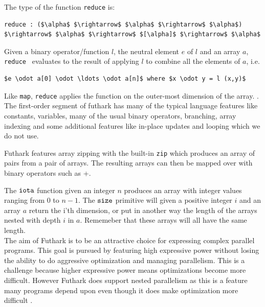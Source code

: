\documentclass[11pt]{article}
\begin{document}
The type of the function {\tt reduce} is: 
\begin{lstlisting}[numbers=none,frame=none]
reduce : ($\alpha$ $\rightarrow$ $\alpha$ $\rightarrow$ $\alpha$) $\rightarrow$ $\alpha$ $\rightarrow$ $[\alpha]$ $\rightarrow$ $\alpha$
\end{lstlisting}
Given a binary operator/function $l$, the neutral element $e$ of $l$ and an array $a$,
{\tt reduce } evaluates to the result of applying $l$ to combine all the elements of $a$, i.e. 
\begin{lstlisting}[numbers=none,frame=none]
$e \odot a[0] \odot \ldots \odot a[n]$ where $x \odot y = l (x,y)$
\end{lstlisting}
Like {\tt map}, {\tt reduce} applies the function on the outer-most dimension of the array. \cite{TroelsHenriksen}.\\ 

The first-order segment of futhark has many of the typical language features like constants, variables, many of the usual binary operators, branching, array indexing and some additional features like in-place updates and looping which we do not use.

Futhark features array zipping with the built-in {\tt zip} which produces an array of pairs from a pair of arrays.
The resulting arrays can then be mapped over with binary operators such as +.

The ${\tt iota}$ function given an integer $n$ produces an array with integer values ranging from 0 to $n-1$.
The ${\tt size}$ primitive will given a positive integer $i$ and an array $a$ return the i'th dimension, or put in another way
the length of the arrays nested with depth $i$ in $a$. Rememeber that these arrays will all have the same length.
\\

The aim of Futhark is to be an attractive choice for expressing complex parallel programs.
This goal is pursued by featuring high expressive power without
losing the ability to do aggressive optimization and managing parallelism.
This is a challenge because higher expressive power means optimizations become more difficult. 
However Futhark does support nested parallelism as this is a feature many programs 
depend upon even though it does make optimization more difficult \cite{TroelsHenriksen}.

\end{document}
